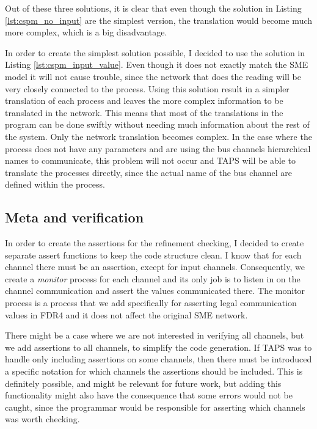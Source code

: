 Out of these three solutions, it is clear that even though the solution in Listing \ref{lst:cspm_no_input} are the simplest version, the translation would become much more complex, which is a big disadvantage.

In order to create the simplest solution possible, I decided to use the solution in Listing \ref{lst:cspm_input_value}. Even though it does not exactly match the SME model it will not cause trouble, since the network that does the reading will be very closely connected to the process. Using this solution result in a simpler translation of each process and leaves the more complex information to be translated in the network. This means that most of the translations in the program can be done swiftly without needing much information about the rest of the system. Only the network translation becomes complex.
In the case where the process does not have any parameters and are using the bus channels hierarchical names to communicate, this problem will not occur and TAPS will be able to translate the processes directly, since the actual name of the bus channel are defined within the process.


\subsection{Meta and verification}

In order to create the assertions for the refinement checking, I decided to create separate assert functions to keep the code structure clean. I know that for each \cspm{} channel there must be an assertion, except for input channels.
Consequently, we create a \textit{monitor} process for each channel and its only job is to listen in on the channel communication and assert the values communicated there. The monitor process is a process that we add specifically for asserting legal communication values in FDR4 and it does not affect the original SME network.

There might be a case where we are not interested in verifying all channels, but we add assertions to all channels, to simplify the code generation. If TAPS was to handle only including assertions on some channels, then there must be introduced a specific notation for which channels the assertions should be included. This is definitely possible, and might be relevant for future work, but adding this functionality might also have the consequence that some errors would not be caught, since the programmar would be responsible for asserting which channels was worth checking.

